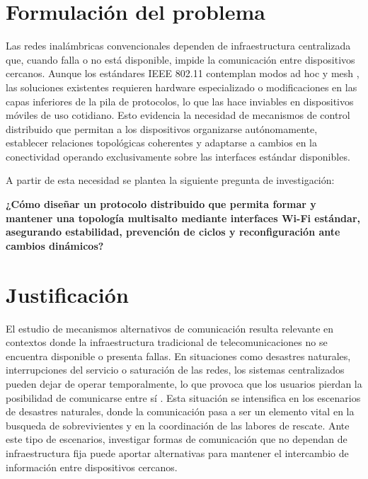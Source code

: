 \documentclass[12pt,oneside]{scrreprt}
\begin{document}
\section{Formulación del problema}

Las redes inalámbricas convencionales dependen de infraestructura centralizada que, cuando falla o no está disponible, impide la comunicación entre dispositivos cercanos. Aunque los estándares IEEE 802.11 contemplan modos ad hoc y mesh \parencite{IEEE2020}, las soluciones existentes requieren hardware especializado o modificaciones en las capas inferiores de la pila de protocolos, lo que las hace inviables en dispositivos móviles de uso cotidiano. Esto evidencia la necesidad de mecanismos de control distribuido que permitan a los dispositivos organizarse autónomamente, establecer relaciones topológicas coherentes y adaptarse a cambios en la conectividad operando exclusivamente sobre las interfaces estándar disponibles.

A partir de esta necesidad se plantea la siguiente pregunta de investigación:

\textbf{¿Cómo diseñar un protocolo distribuido que permita formar y mantener una topología multisalto mediante interfaces Wi-Fi estándar, asegurando estabilidad, prevención de ciclos y reconfiguración ante cambios dinámicos?}

\section{Justificación}

El estudio de mecanismos alternativos de comunicación resulta relevante en contextos donde la infraestructura tradicional de telecomunicaciones no se encuentra disponible o presenta fallas. En situaciones como desastres naturales, interrupciones del servicio o saturación de las redes, los sistemas centralizados pueden dejar de operar temporalmente, lo que provoca que los usuarios pierdan la posibilidad de comunicarse entre sí \parencite{Akyildiz2005}. Esta situación se intensifica en los escenarios de desastres naturales, donde la comunicación pasa a ser un elemento vital en la busqueda de sobrevivientes y en la coordinación de las labores de rescate. Ante este tipo de escenarios, investigar formas de comunicación que no dependan de infraestructura fija puede aportar alternativas para mantener el intercambio de información entre dispositivos cercanos.
\end{document}
